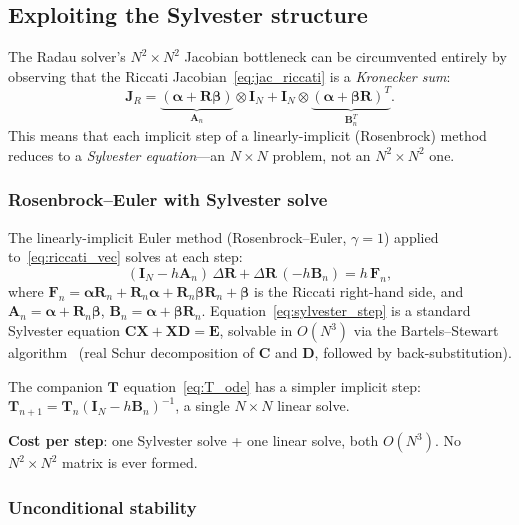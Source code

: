 \documentclass[11pt,a4paper]{article}
\newcommand{\mat}[1]{\mathbf{#1}}
\theoremstyle{definition}
\begin{document}
\subsection{Exploiting the Sylvester structure}
\label{sec:sylvester}

The Radau solver's $N^2\!\times\!N^2$ Jacobian bottleneck can be
circumvented entirely by observing that the Riccati
Jacobian~\eqref{eq:jac_riccati} is a \emph{Kronecker sum}:
\begin{equation}
  \mat{J}_R
  = \underbrace{(\mat{\alpha}+\mat{R}\mat{\beta})}_{\mat{A}_n}
    \otimes\mat{I}_N
  + \mat{I}_N\otimes
    \underbrace{(\mat{\alpha}+\mat{\beta}\mat{R})^T}_{\mat{B}_n^T}.
\end{equation}
This means that each implicit step of a linearly-implicit (Rosenbrock)
method reduces to a \emph{Sylvester equation}---an
$N\!\times\!N$ problem, not an $N^2\!\times\!N^2$ one.

\subsubsection{Rosenbrock--Euler with Sylvester solve}

The linearly-implicit Euler method (Rosenbrock--Euler, $\gamma=1$)
applied to~\eqref{eq:riccati_vec} solves at each step:
\begin{equation}\label{eq:sylvester_step}
  (\mat{I}_N - h\mat{A}_n)\,\Delta\mat{R}
  + \Delta\mat{R}\,(-h\mat{B}_n) = h\,\mat{F}_n,
\end{equation}
where $\mat{F}_n = \mat{\alpha}\mat{R}_n + \mat{R}_n\mat{\alpha}
+ \mat{R}_n\mat{\beta}\mat{R}_n + \mat{\beta}$ is the Riccati
right-hand side, and
$\mat{A}_n=\mat{\alpha}+\mat{R}_n\mat{\beta}$,
$\mat{B}_n=\mat{\alpha}+\mat{\beta}\mat{R}_n$.
Equation~\eqref{eq:sylvester_step} is a standard Sylvester equation
$\mat{C}\mat{X}+\mat{X}\mat{D}=\mat{E}$, solvable in $O(N^3)$ via
the Bartels--Stewart algorithm~\cite{bartels1972} (real Schur
decomposition of $\mat{C}$ and $\mat{D}$, followed by
back-substitution).

The companion $\mat{T}$ equation~\eqref{eq:T_ode} has a simpler
implicit step:
$\mat{T}_{n+1}=\mat{T}_n(\mat{I}_N-h\mat{B}_n)^{-1}$,
a single $N\!\times\!N$ linear solve.

\textbf{Cost per step}: one Sylvester solve + one linear solve, both
$O(N^3)$.  No $N^2\!\times\!N^2$ matrix is ever formed.

\subsubsection{Unconditional stability}
\end{document}
